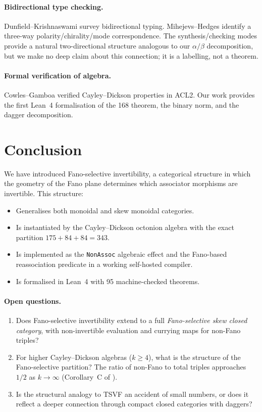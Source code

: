\documentclass[11pt,a4paper]{article}
\theoremstyle{definition}
\theoremstyle{remark}
\begin{document}
\paragraph{Bidirectional type checking.}
Dunfield--Krishnaswami \cite{dunfield2021} survey bidirectional typing.
Mihejevs--Hedges \cite{mihejevs2025} identify a three-way
polarity/chirality/mode correspondence. The synthesis/checking modes
provide a natural two-directional structure analogous to our
$\alpha/\beta$ decomposition, but we make no deep claim about this
connection; it is a labelling, not a theorem.

\paragraph{Formal verification of algebra.}
Cowles--Gamboa \cite{cowles2017} verified Cayley--Dickson properties
in ACL2. Our work provides the first Lean~4 formalisation of the
168 theorem, the binary norm, and the dagger decomposition.

\section{Conclusion}\label{sec:conclusion}

We have introduced Fano-selective invertibility, a categorical
structure in which the geometry of the Fano plane determines which
associator morphisms are invertible. This structure:

\begin{itemize}
\item Generalises both monoidal and skew monoidal categories.
\item Is instantiated by the Cayley--Dickson octonion algebra with
  the exact partition $175 + 84 + 84 = 343$.
\item Is implemented as the \texttt{NonAssoc} algebraic effect and
  the Fano-based reassociation predicate in a working self-hosted compiler.
\item Is formalised in Lean~4 with 95 machine-checked theorems.
\end{itemize}

\paragraph{Open questions.}
\begin{enumerate}
\item Does Fano-selective invertibility extend to a full
  \emph{Fano-selective skew closed category}, with non-invertible
  evaluation and currying maps for non-Fano triples?
\item For higher Cayley--Dickson algebras ($k \geq 4$), what is the
  structure of the Fano-selective partition? The ratio of non-Fano to
  total triples approaches $1/2$ as $k \to \infty$ (Corollary~C of
  \cite{agourakis2026}).
\item Is the structural analogy to TSVF an accident of small numbers,
  or does it reflect a deeper connection through compact closed
  categories with daggers?
\end{enumerate}
\end{document}
